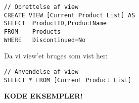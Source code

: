 \begin{lstlisting}[caption=Kodeeksempel for View,label=code:view,morekeywords={CREATE, VIEW, AS, SELECT, FROM, WHERE}]
// Oprettelse af view
CREATE VIEW [Current Product List] AS
SELECT 	ProductID,ProductName
FROM 	Products
WHERE 	Discontinued=No
\end{lstlisting}

Da vi view'et bruges som vist her: 

\begin{lstlisting}[caption=Kodeeksempel for anvendelse af View,label=code:view,morekeywords={CREATE, VIEW, AS, SELECT, FROM, WHERE}]
// Anvendelse af view
SELECT * FROM [Current Product List]
\end{lstlisting}

\textbf{\large KODE EKSEMPLER!}
